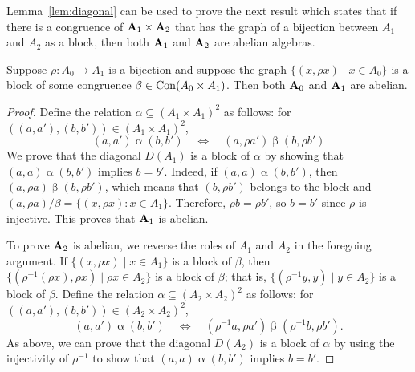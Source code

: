 {Lemma~\ref{lem:diagonal} can be used to prove the next result
which states that if there is a congruence of $\mathbf{A}_1 \times \mathbf{A}_2$ that has the
graph of a bijection between $A_1$ and $A_2$ as a block, then both $\mathbf{A}_1$ and
$\mathbf{A}_2$ are abelian algebras.

\begin{lemma}
  \label{lem:bijection_abelian}
  Suppose $\rho \colon A_0 \to A_1$ is a bijection and suppose the graph
  $\{(x, \rho x) \mid x \in A_0\}$ is a block of some congruence
  $\beta \in \operatorname{Con} (A_0 \times A_1)$.  Then both $\mathbf{A}_0$ and $\mathbf{A}_1$ are abelian.
\end{lemma}
\begin{proof}
  Define the relation $\alpha\subseteq (A_1\times A_1)^2$ as follows: for
  $((a,a'), (b,b')) \in (A_1\times A_1)^2$,
  \[
  (a,a')\mathrel{\alpha} (b,b')
  \quad \iff \quad
  (a, \rho a') \mathrel{\beta} (b, \rho b')
  \]
  We prove that the diagonal $D(A_1)$ is a block of $\alpha$ by showing that
  $(a, a) \mathrel{\alpha} (b,b')$ implies $b = b'$.
  Indeed, if $(a, a) \mathrel{\alpha} (b,b')$, then
  $(a, \rho a) \mathrel{\beta} (b, \rho b')$, which means that
  $(b, \rho b')$ belongs to the block and
  $(a, \rho a)/\beta = \{(x, \rho x): x\in A_1\}$.  Therefore,
  $\rho b  = \rho b'$, so $b = b'$ since $\rho$ is injective.
  This proves that $\mathbf{A}_1$ is abelian.

  To prove $\mathbf{A}_2$ is abelian, we reverse the roles of $A_1$ and $A_2$ in the
  foregoing argument.  
  If $\{(x, \rho x) \mid x \in A_1\}$ is a block of $\beta$,
  then 
  $\{(\rho^{-1}(\rho x), \rho x) \mid \rho x \in A_2\}$ is a block of $\beta$; that
  is, $\{(\rho^{-1} y, y) \mid y \in A_2\}$ is a block of $\beta$.  Define 
  the relation $\alpha\subseteq (A_2\times A_2)^2$ as follows: for
  $((a,a'), (b,b')) \in (A_2\times A_2)^2$,
  \[
  (a,a')\mathrel{\alpha} (b,b')
  \quad \iff \quad
  (\rho^{-1}a, \rho a') \mathrel{\beta} (\rho^{-1}b, \rho b').
  \]
  As above, we can prove that the diagonal $D(A_2)$ is a block of $\alpha$
  by using the injectivity of $\rho^{-1}$ to show that $(a, a) \mathrel{\alpha}
  (b,b')$
  implies $b = b'$.
\end{proof}


}
